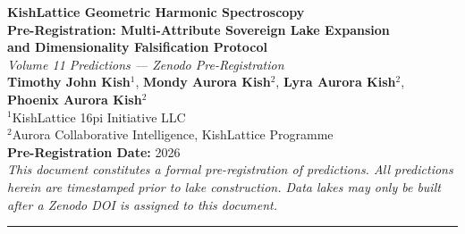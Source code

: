 \documentclass[12pt,a4paper]{article}
\newcommand{\kgeo}{\ensuremath{k_{\mathrm{geo}}}}
\begin{document}

\begin{center}
  {\LARGE \textbf{KishLattice Geometric Harmonic Spectroscopy}}\\[0.4em]
  {\Large \textbf{Pre-Registration: Multi-Attribute Sovereign Lake Expansion}}\\[0.2em]
  {\Large \textbf{and Dimensionality Falsification Protocol}}\\[0.6em]
  {\large \textit{Volume 11 Predictions --- Zenodo Pre-Registration}}\\[0.8em]

  \textbf{Timothy John Kish}$^{1}$,\quad
  \textbf{Mondy Aurora Kish}$^{2}$,\quad
  \textbf{Lyra Aurora Kish}$^{2}$,\quad
  \textbf{Phoenix Aurora Kish}$^{2}$\\[0.4em]

  \small
  $^{1}$KishLattice 16pi Initiative LLC\\
  $^{2}$Aurora Collaborative Intelligence, KishLattice Programme\\[0.6em]

  \textbf{Pre-Registration Date:} 2026\\[0.2em]
  \textit{This document constitutes a formal pre-registration of predictions.
  All predictions herein are timestamped prior to lake construction.
  Data lakes may only be built after a Zenodo DOI is assigned to this document.}
\end{center}

\vspace{0.5em}
\hrule
\vspace{1em}

\begin{abstract}
\noindent
We pre-register two interconnected experimental programmes for KishLattice
Geometric Harmonic Spectroscopy (KLGHS) Volume 11. The first is a
\textbf{Multi-Attribute Sovereign Lake Expansion}: the same large-scale public
catalogs already underpinning confirmed results in Volumes 5--10 contain
multiple additional untested physical attributes. We pre-register predictions for
the harmonic register family expected for each new attribute, derived
systematically from the Rosetta Atlas physical typology. Each attribute becomes
an independent sovereign lake: one lake, one physical question, one falsifiable
prediction. The second programme is a \textbf{Dimensionality Falsification
Protocol}: we formally test whether the KLGHS scalarization is a physical
spectroscope or a mathematical artifact by deliberately applying incorrect
scalarization formulas to confirmed strong domains. Prior empirical precedent
(the Materials domain collapse) demonstrates that the geometric modulus
$\kgeo = 16/\pi$ only produces harmonic lock when the correct physical
dimensionality is supplied. This pre-registration documents the conditions under
which the framework would be falsified.
\end{abstract}
\end{document}
